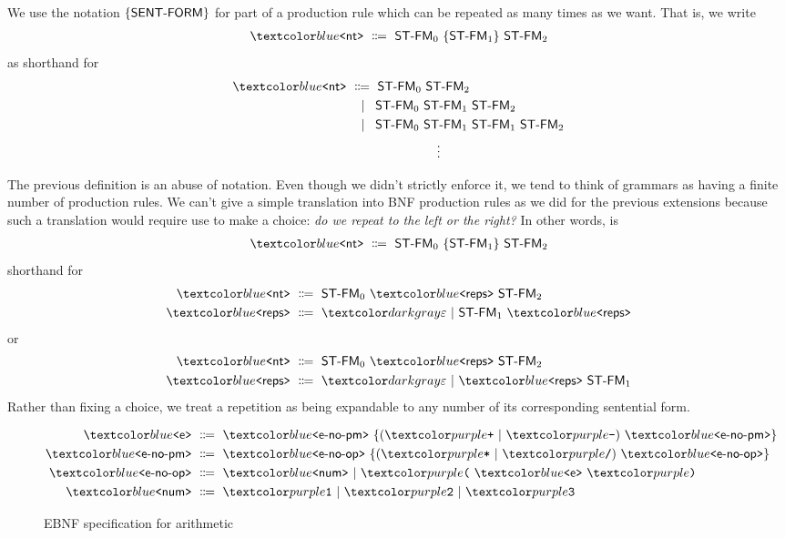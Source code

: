 \begin{definition}
  We use the notation ${\{ \textsf{SENT-FORM} \}}$ for part of a production rule which can be repeated as many times as we want.
  That is, we write
  \begin{align*}
    \bnfnt{nt} \bnfeq \textsf{ST-FM}_0 \ \bnfrep{\textsf{ST-FM}_1} \ \textsf{ST-FM}_2
  \end{align*}
  as shorthand for
  \begin{align*}
    \bnfnt{nt} &\bnfeq \textsf{ST-FM}_0 \ \textsf{ST-FM}_2 \\
    &\bnfaltn \textsf{ST-FM}_0 \ \textsf{ST-FM}_1 \ \textsf{ST-FM}_2 \\
    &\bnfaltn \textsf{ST-FM}_0 \ \textsf{ST-FM}_1 \ \textsf{ST-FM}_1 \ \textsf{ST-FM}_2 \\
    &\hspace{25mm}\vdots
\end{align*}
\end{definition}
%
The previous definition is an abuse of notation.
Even though we didn't strictly enforce it, we tend to think of grammars as having a finite number of production rules.
We can't give a simple translation into BNF production rules as we did for the previous extensions because such a translation would require use to make a choice: \textit{do we repeat to the left or the right?}
In other words, is
\begin{align*}
  \bnfnt{nt} \bnfeq \textsf{ST-FM}_0 \ \bnfrep{\textsf{ST-FM}_1} \ \textsf{ST-FM}_2
\end{align*}
shorthand for
\begin{align*}
  \bnfnt{nt} &\bnfeq \textsf{ST-FM}_0 \ \bnfnt{reps} \ \textsf{ST-FM}_2 \\
  \bnfnt{reps} &\bnfeq \bnfempty \bnfalt \textsf{ST-FM}_1 \ \bnfnt{reps}
\end{align*}
or
\begin{align*}
  \bnfnt{nt} &\bnfeq \textsf{ST-FM}_0 \ \bnfnt{reps} \ \textsf{ST-FM}_2 \\
  \bnfnt{reps} &\bnfeq \bnfempty \bnfalt \bnfnt{reps} \ \textsf{ST-FM}_1
\end{align*}
Rather than fixing a choice, we treat a repetition as being expandable to any number of its corresponding sentential form.

\begin{figure}
  \begin{align*}
    \bnfnt{e} &\bnfeq
    \bnfnt{e-no-pm} \ \bnfrep{( \bnft{+} \bnfalt \bnft{-} ) \ \bnfnt{e-no-pm}} \\
    \bnfnt{e-no-pm} &\bnfeq
    \bnfnt{e-no-op} \ \bnfrep{( \bnft{*} \bnfalt \bnft{/} ) \ \bnfnt{e-no-op}} \\
    \bnfnt{e-no-op} &\bnfeq
    \bnfnt{num} \bnfalt
    \bnft{(} \ \bnfnt{e} \ \bnft{)} \\
    \bnfnt{num} &\bnfeq \bnft{1} \bnfalt \bnft{2} \bnfalt \bnft{3}
  \end{align*}
  \caption{EBNF specification for arithmetic}
  \label{fig:arith-short}
\end{figure}

